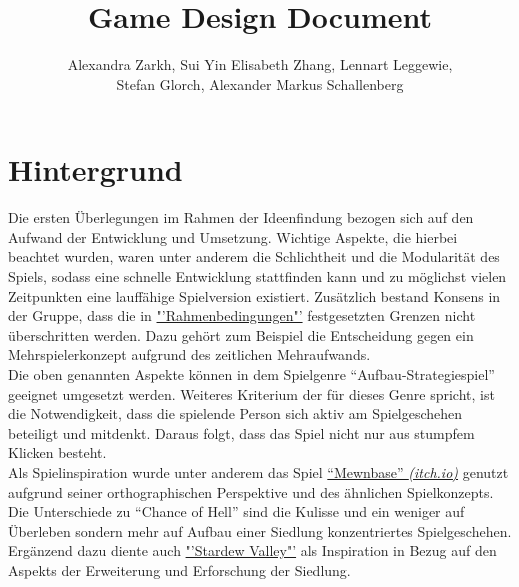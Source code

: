 \documentclass[paper=A4,pagesize=auto,12pt,headinclude=true,footinclude=true,BCOR=0mm,DIV=calc]{scrartcl}
\title{Game Design Document}
\author{Alexandra Zarkh, Sui Yin Elisabeth Zhang, Lennart Leggewie,\\ Stefan Glorch, Alexander Markus Schallenberg}
\begin{document}
	
\begin{titlepage}
	\maketitle
\end{titlepage}


\tableofcontents
\newpage

\section{Hintergrund}\label{sec:Hintergrund}




Die ersten Überlegungen im Rahmen der Ideenfindung bezogen sich auf den Aufwand der Entwicklung und Umsetzung. Wichtige Aspekte, die hierbei beachtet wurden, waren unter anderem die Schlichtheit und die Modularität des Spiels, sodass eine schnelle Entwicklung stattfinden kann und zu möglichst vielen Zeitpunkten eine lauffähige Spielversion existiert. Zusätzlich bestand Konsens in der Gruppe, dass die in \hyperref[sec:Rahmenbedingungen]{"'Rahmenbedingungen"'} festgesetzten Grenzen nicht überschritten werden. Dazu gehört zum Beispiel die Entscheidung gegen ein Mehrspielerkonzept aufgrund des zeitlichen Mehraufwands.\\
Die oben genannten Aspekte können in dem Spielgenre "`Aufbau-Strategiespiel"' geeignet umgesetzt werden. Weiteres Kriterium der für dieses Genre spricht, ist die Notwendigkeit, dass die spielende Person sich aktiv am Spielgeschehen beteiligt und mitdenkt. Daraus folgt, dass das Spiel nicht nur aus stumpfem Klicken besteht.\\
Als Spielinspiration wurde unter anderem das Spiel \hyperref{https://cairn4.itch.io/mewnbase}{}{}{"`Mewnbase"' \textit{(itch.io)}} genutzt aufgrund seiner orthographischen Perspektive und des ähnlichen Spielkonzepts. Die Unterschiede zu "`Chance of Hell"' sind die Kulisse und ein weniger auf Überleben sondern mehr auf Aufbau einer Siedlung konzentriertes Spielgeschehen.\\
Ergänzend dazu diente auch \hyperref{https://www.stardewvalley.net/}{}{}{"'Stardew Valley"'} als Inspiration in Bezug auf den Aspekts der Erweiterung und Erforschung der Siedlung.
\end{document}
